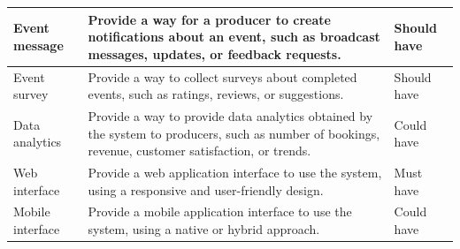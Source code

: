 \documentclass[a4paper,12pt]{article}
\begin{document}
\begin{table}[!h]
\begin{tabular}{|l|p{10cm}|l|}
\hline
Event message & Provide a way for a producer to create notifications about an event, such as broadcast messages, updates, or feedback requests. & Should have \\
\hline
Event survey & Provide a way to collect surveys about completed events, such as ratings, reviews, or suggestions. & Should have \\
\hline
Data analytics & Provide a way to provide data analytics obtained by the system to producers, such as number of bookings, revenue, customer satisfaction, or trends. & Could have \\
\hline
Web interface & Provide a web application interface to use the system, using a responsive and user-friendly design. & Must have \\
\hline
Mobile interface & Provide a mobile application interface to use the system, using a native or hybrid approach. & Could have \\
\hline
\end{tabular}
\end{table}
\end{document}
